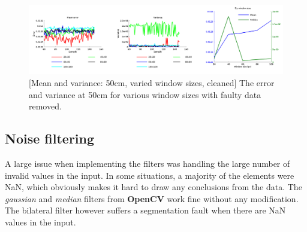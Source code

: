 \documentclass[11pt]{article}
\begin{document}
\begin{figure}[ht]
  \centering
  \includegraphics[width=1\textwidth]{figures/plot2bywindowsize.png}
  [Mean and variance: 50cm, varied window sizes, cleaned]{\label{fig:variedwindow2} The error and variance at 50cm for various window sizes with faulty data removed.}
\end{figure}

\subsection{Noise filtering}

A large issue when implementing the filters was handling the large number of invalid values in the input. In some situations, a majority of the elements were NaN, which obviously makes it hard to draw any conclusions from the data. The \emph{gaussian} and \emph{median} filters from \textbf{OpenCV} work fine  without any modification. The bilateral filter however suffers a segmentation fault when there are NaN values in the input. \par
\end{document}
